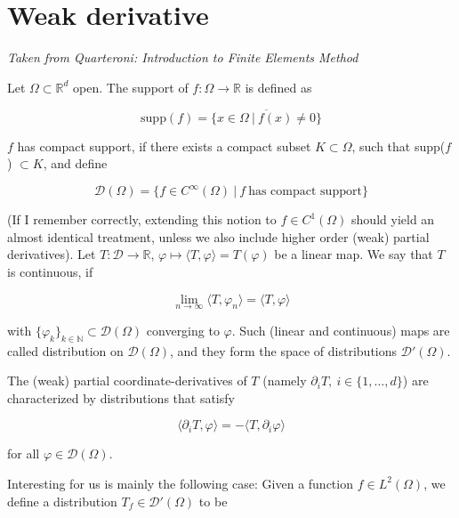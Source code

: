 \documentclass[11pt, a4paper]{article}
\begin{document}
\section{Weak derivative}
\label{sec:weak}

\textit{Taken from Quarteroni: Introduction to Finite Elements Method}

Let $\Omega \subset \mathbb{R}^d$ open. The support of $f:\Omega \to \mathbb{R}$
is defined as

\begin{equation}
    \text{supp}(f) = \overline{\{x \in \Omega ~|~ f(x) \neq 0\}}
\end{equation}

$f$ has compact support, if there exists a compact subset $K \subset \Omega$,
such that supp($f$) $\subset K$, and define

\begin{equation}
    \mathcal{D}(\Omega) = \{f \in C^{\infty}(\Omega) ~|~ f ~\text{has compact support}\}
\end{equation}

(If I remember correctly, extending this notion to $f \in C^1(\Omega)$ should yield
an almost identical treatment, unless we also include higher order (weak) partial derivatives).
Let $T: \mathcal{D} \to \mathbb{R}$, $\varphi \mapsto \langle T, \varphi \rangle = T(\varphi)$
be a linear map. We say that $T$ is continuous, if

\begin{equation}
    \lim_{n\to\infty} \langle T, \varphi_n \rangle = \langle T, \varphi \rangle
\end{equation}

with $\{\varphi_k\}_{k \in \mathbb{N}} \subset \mathcal{D}(\Omega)$ converging to $\varphi$.
Such (linear and continuous) maps are called distribution on $\mathcal{D}(\Omega)$,
and they form the space of distributions $\mathcal{D}'(\Omega)$.

The (weak) partial coordinate-derivatives of $T$ (namely $\partial_i T, ~i \in \{1, \dots, d\}$)
are characterized by distributions that satisfy

\begin{equation}
    \langle \partial_i T, \varphi \rangle = - \langle T, \partial_i \varphi \rangle 
\end{equation}

for all $\varphi \in \mathcal{D}(\Omega)$. 

Interesting for us is mainly the following case:
Given a function $f \in L^2(\Omega)$, we define a distribution $T_f \in \mathcal{D}'(\Omega)$
to be 
\end{document}

